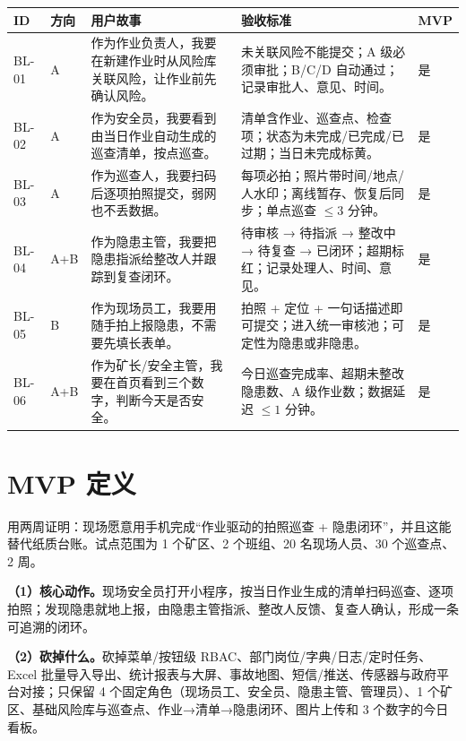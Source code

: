 \documentclass[11pt,a4paper,twoside,fontset=fandol]{ctexart}
\begin{document}
\begin{table}[H]
\centering
\scriptsize
\renewcommand{\arraystretch}{1.05}
\begin{tabularx}{\linewidth}{@{}>{\raggedright\arraybackslash}p{11mm}>{\raggedright\arraybackslash}p{7mm}X X>{\centering\arraybackslash}p{7mm}@{}}
\toprule
\textbf{ID} & \textbf{方向} & \textbf{用户故事} & \textbf{验收标准} & \textbf{MVP} \\
\midrule
BL-01 & A & 作为作业负责人，我要在新建作业时从风险库关联风险，让作业前先确认风险。 & 未关联风险不能提交；A 级必须审批；B/C/D 自动通过；记录审批人、意见、时间。 & 是 \\
BL-02 & A & 作为安全员，我要看到由当日作业自动生成的巡查清单，按点巡查。 & 清单含作业、巡查点、检查项；状态为未完成/已完成/已过期；当日未完成标黄。 & 是 \\
BL-03 & A & 作为巡查人，我要扫码后逐项拍照提交，弱网也不丢数据。 & 每项必拍；照片带时间/地点/人水印；离线暂存、恢复后同步；单点巡查 $\le 3$ 分钟。 & 是 \\
BL-04 & A+B & 作为隐患主管，我要把隐患指派给整改人并跟踪到复查闭环。 & 待审核 → 待指派 → 整改中 → 待复查 → 已闭环；超期标红；记录处理人、时间、意见。 & 是 \\
BL-05 & B & 作为现场员工，我要用随手拍上报隐患，不需要先填长表单。 & 拍照 + 定位 + 一句话描述即可提交；进入统一审核池；可定性为隐患或非隐患。 & 是 \\
BL-06 & A+B & 作为矿长/安全主管，我要在首页看到三个数字，判断今天是否安全。 & 今日巡查完成率、超期未整改隐患数、A 级作业数；数据延迟 $\le 1$ 分钟。 & 是 \\
\bottomrule
\end{tabularx}
\end{table}

\newpage

\section{MVP 定义}

用两周证明：现场愿意用手机完成“作业驱动的拍照巡查 + 隐患闭环”，并且这能替代纸质台账。试点范围为 1 个矿区、2 个班组、20 名现场人员、30 个巡查点、2 周。

\noindent\textbf{（1）核心动作。}现场安全员打开小程序，按当日作业生成的清单扫码巡查、逐项拍照；发现隐患就地上报，由隐患主管指派、整改人反馈、复查人确认，形成一条可追溯的闭环。

\noindent\textbf{（2）砍掉什么。}砍掉菜单/按钮级 RBAC、部门岗位/字典/日志/定时任务、Excel 批量导入导出、统计报表与大屏、事故地图、短信/推送、传感器与政府平台对接；只保留 4 个固定角色（现场员工、安全员、隐患主管、管理员）、1 个矿区、基础风险库与巡查点、作业→清单→隐患闭环、图片上传和 3 个数字的今日看板。
\end{document}
